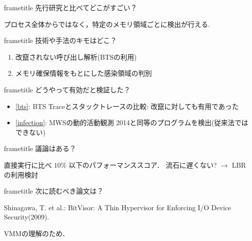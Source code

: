 \begin{frame}[plain,t]
\begin{multicols}{2}
    \vfill
    \begin{beamercolorbox}[rounded=true, center, shadow=true,wd=\linewidth]{frametitle}
      先行研究と比べてどこがすごい？
    \end{beamercolorbox}
    プロセス全体からではなく，特定のメモリ領域ごとに検出が行える.

    \vfill
    \begin{beamercolorbox}[rounded=true, center, shadow=true,wd=\linewidth]{frametitle}
      技術や手法のキモはどこ？
    \end{beamercolorbox}
    \begin{enumerate}
      \item 改竄されない呼び出し解析(BTSの利用) \label{bts}
      \item メモリ確保情報をもとにした感染領域の判別 \label{infection}
    \end{enumerate}

    \newpage
    \begin{beamercolorbox}[rounded=true, center, shadow=true,wd=\linewidth]{frametitle}
      どうやって有効だと検証した？
    \end{beamercolorbox}
    \begin{itemize}
      \item \ref{bts}: BTS Traceとスタックトレースの比較: 改竄に対しても有用であった
      \item \ref{infection}: MWSの動的活動観測 2014と同等のプログラムを検出(従来法ではできない)
    \end{itemize}

    \vfill
    \begin{beamercolorbox}[rounded=true, center, shadow=true,wd=\linewidth]{frametitle}
      議論はある？
    \end{beamercolorbox}
    直接実行に比べ $10\%$ 以下のパフォーマンススコア． 流石に遅くない? $\to$ LBRの利用検討

    \vfill
    \begin{beamercolorbox}[rounded=true, center, shadow=true,wd=\linewidth]{frametitle}
      次に読むべき論文は？
    \end{beamercolorbox}
    Shinagawa, T. et al.: BitVisor: A Thin Hypervisor for Enforcing I/O Device Security(2009).

    VMMの理解のため．

  \end{multicols}
\end{frame}

